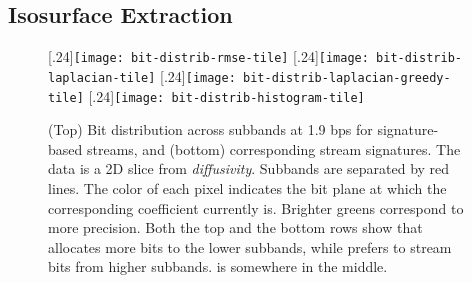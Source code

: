 \subsection{Isosurface Extraction}\label{sec:isocontour}


\begin{figure}[!b]
\vspace{-1em}
\centering
 \subcaptionbox{\label{fig:bit-distrib-rmse-tile}$\srsg$}[.24\linewidth]{{\texttt{[image: bit-distrib-rmse-tile]}\vspace{-0.5em}}}
 \subcaptionbox{\label{fig:bit-distrib-laplacian-tile}$\slsg$}[.24\linewidth]{{\texttt{[image: bit-distrib-laplacian-tile]}\vspace{-0.5em}}}
 \subcaptionbox{\label{fig:bit-distrib-laplacian-greedy-tile}$\slop$}[.24\linewidth]{{\texttt{[image: bit-distrib-laplacian-greedy-tile]}\vspace{-0.5em}}}
 \subcaptionbox{\label{fig:bit-distrib-histogram-tile}$\shsg$}[.24\linewidth]{{\texttt{[image: bit-distrib-histogram-tile]}\vspace{-0.5em}}}
 \vspace{-0.5em}
\caption{(Top) Bit distribution across subbands at 1.9 bps for signature-based streams, and (bottom)
corresponding stream signatures. The data is a 2D slice from \emph{diffusivity}. Subbands are
separated by red lines. The color of each pixel indicates the bit plane at which the corresponding
coefficient currently is. Brighter greens correspond to more precision. Both the top and the bottom
rows show that \shsg allocates more bits to the lower subbands, while \slsg prefers to stream bits
from higher subbands. \srsg is somewhere in the middle.}
\label{fig:bit-distrib}
\vspace{-1.5em}
\end{figure}


